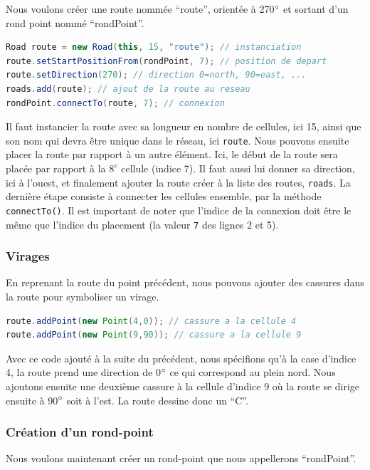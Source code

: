 \documentclass[a4paper,11pt, titlepage]{extarticle}
\begin{document}
Nous voulons créer une route nommée ``route'', orientée à 270$\degree$ et sortant d'un rond point nommé ``rondPoint''.

\begin{lstlisting}[language=Java]
Road route = new Road(this, 15, "route"); // instanciation
route.setStartPositionFrom(rondPoint, 7); // position de depart
route.setDirection(270); // direction 0=north, 90=east, ...
roads.add(route); // ajout de la route au reseau
rondPoint.connectTo(route, 7); // connexion
\end{lstlisting}

Il faut instancier la route avec sa longueur en nombre de cellules, ici 15, ainsi que son nom qui devra être unique dans le réseau, ici \texttt{route}. Nous pouvons ensuite placer la route par rapport à un autre élément. Ici, le début de la route sera placée par rapport à la $8^e$ cellule (indice 7). Il faut aussi lui donner sa direction, ici à l'ouest, et finalement ajouter la route créer à la liste des routes, \texttt{roads}. La dernière étape consiste à connecter les cellules ensemble, par la méthode \texttt{connectTo()}. Il est important de noter que l'indice de la connexion doit être le même que l'indice du placement (la valeur \texttt{7} des lignes 2 et 5).

\subsubsection{Virages}

En reprenant la route du point précédent, nous pouvons ajouter des cassures dans la route pour symboliser un virage.

\begin{lstlisting}[language=Java]
route.addPoint(new Point(4,0)); // cassure a la cellule 4
route.addPoint(new Point(9,90)); // cassure a la cellule 9
\end{lstlisting}

Avec ce code ajouté à la suite du précédent, nous spécifions qu'à la case d'indice 4, la route prend une direction de 0$\degree$ ce qui correspond au plein nord. Nous ajoutons ensuite une deuxième cassure à la cellule d'indice 9 où la route se dirige ensuite à 90$\degree$ soit à l'est. La route dessine donc un ``C''.

\subsubsection{Création d'un rond-point}

Nous voulons maintenant créer un rond-point que nous appellerons ``rondPoint''.
\end{document}
